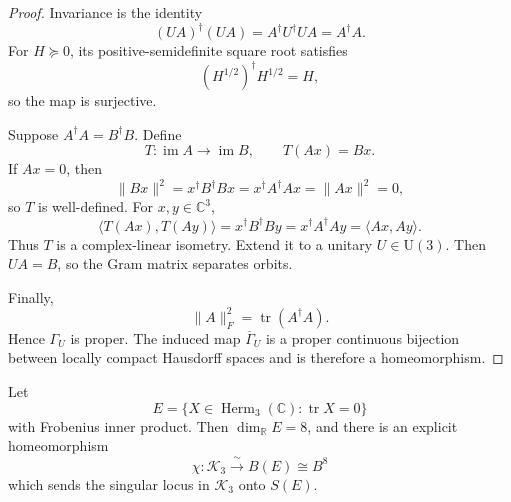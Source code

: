 \begin{proof}
Invariance is the identity
\[
 (UA)^\dagger(UA)=A^\dagger U^\dagger UA=A^\dagger A.
\]
For \(H\succeq0\), its positive-semidefinite square root satisfies
\[
 (H^{1/2})^\dagger H^{1/2}=H,
\]
so the map is surjective.

Suppose \(A^\dagger A=B^\dagger B\).  Define
\[
 T:\operatorname{im}A\longrightarrow\operatorname{im}B,
 \qquad
 T(Ax)=Bx.
\]
If \(Ax=0\), then
\[
 \lVert Bx\rVert^2
 =x^\dagger B^\dagger Bx
 =x^\dagger A^\dagger Ax
 =\lVert Ax\rVert^2
 =0,
\]
so \(T\) is well-defined.  For \(x,y\in\mathbb C^3\),
\[
 \langle T(Ax),T(Ay)\rangle
 =x^\dagger B^\dagger By
 =x^\dagger A^\dagger Ay
 =\langle Ax,Ay\rangle.
\]
Thus \(T\) is a complex-linear isometry.  Extend it to a unitary
\(U\in\mathrm U(3)\).  Then \(UA=B\), so the Gram matrix separates
orbits.

Finally,
\[
 \lVert A\rVert_F^2=\operatorname{tr}(A^\dagger A).
\]
Hence \(\Gamma_U\) is proper.  The induced map
\(\overline\Gamma_U\) is a proper continuous bijection between locally
compact Hausdorff spaces and is therefore a homeomorphism.
\end{proof}

\begin{lemma}
\label{lem:hr3c-density-ball}
Let
\begin{equation}
 E=\{X\in\operatorname{Herm}_3(\mathbb C):\operatorname{tr}X=0\}
 \label{eq:hr3c-traceless-space}
\end{equation}
with Frobenius inner product.  Then
\(\dim_{\mathbb R}E=8\), and there is an explicit homeomorphism
\begin{equation}
 \chi:\mathcal K_3\xrightarrow{\ \sim\ }B(E)\cong B^8
 \label{eq:hr3c-chi-homeomorphism}
\end{equation}
which sends the singular locus in \(\mathcal K_3\) onto \(S(E)\).
\end{lemma}

